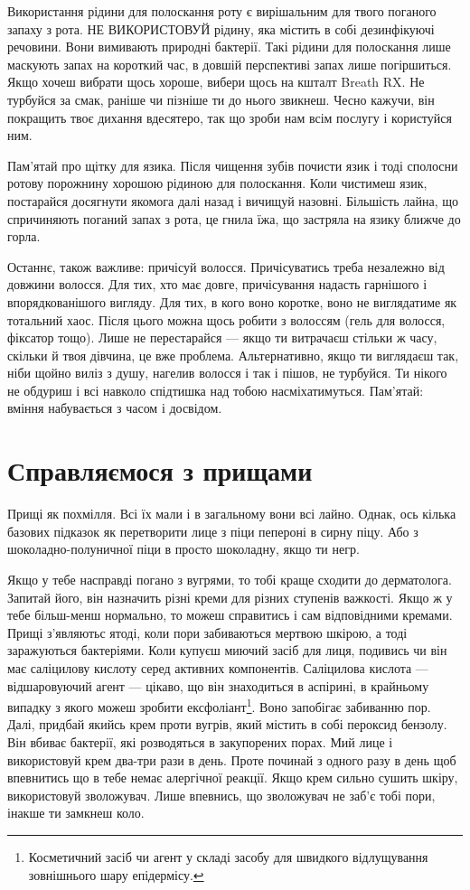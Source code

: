 Використання рідини для полоскання роту є вирішальним для твого поганого запаху
з рота. НЕ ВИКОРИСТОВУЙ рідину, яка містить в собі дезинфікуючі речовини. Вони
вимивають природні бактерії. Такі рідини для полоскання лише маскують запах
на короткий час, в довшій перспективі запах лише погіршиться. Якщо хочеш
вибрати щось хороше, вибери щось на кшталт Breath RX. Не турбуйся за смак,
раніше чи пізніше ти до нього звикнеш. Чесно кажучи, він покращить твоє дихання
вдесятеро, так що зроби нам всім послугу і користуйся ним.

Пам’ятай про щітку для язика. Після чищення зубів почисти язик і тоді сполосни
ротову порожнину хорошою рідиною для полоскання. Коли чистимеш язик, постарайся
досягнути якомога далі назад і вичищуй назовні. Більшість лайна, що спричиняють
поганий запах з рота, це гнила їжа, що застряла на язику ближче до горла.

Останнє, також важливе: причісуй волосся. Причісуватись треба незалежно від
довжини волосся. Для тих, хто має довге, причісування надасть гарнішого і
впорядкованішого вигляду. Для тих, в кого воно коротке, воно не виглядатиме як
тотальний хаос. Після цього можна щось робити з волоссям (гель для волосся,
фіксатор тощо). Лише не перестарайся — якщо ти витрачаєш стільки ж часу,
скільки й твоя дівчина, це вже проблема. Альтернативно, якщо ти виглядаєш так,
ніби щойно виліз з душу, нагелив волосся і так і пішов, не турбуйся. Ти нікого
не обдуриш і всі навколо спідтишка над тобою насміхатимуться. Пам’ятай: вміння
набувається з часом і досвідом.

\section{Справляємося з прищами}
Прищі як похмілля. Всі їх мали і в загальному вони всі лайно. Однак, ось кілька
базових підказок як перетворити лице з піци пепероні в сирну піцу. Або з
шоколадно-полуничної піци в просто шоколадну, якщо ти негр.

Якщо у тебе насправді погано з вугрями, то тобі краще сходити до дерматолога.
Запитай його, він назначить різні креми для різних ступенів важкості. Якщо ж
у тебе більш-менш нормально, то можеш справитись і сам відповідними кремами.
Прищі з’являютьс ятоді, коли пори забиваються мертвою шкірою, а тоді
заражуються бактеріями. Коли купуєш миючий засіб для лиця, подивись чи він має
саліцилову кислоту серед активних компонентів. Саліцилова кислота —
відшаровуючий агент — цікаво, що він знаходиться в аспірині, в крайньому
випадку з якого можеш зробити ексфоліант\footnote{Косметичний засіб чи агент
у складі засобу для швидкого відлущування зовнішнього шару епідермісу.}. Воно
запобігає забиванню пор. Далі, придбай якийсь крем проти вугрів, який містить
в собі пероксид бензолу. Він вбиває бактерії, які розводяться в закупорених
порах. Мий лице і використовуй крем два-три рази в день. Проте починай з одного
разу в день щоб впевнитись що в тебе немає алергічної реакції. Якщо крем сильно
сушить шкіру, використовуй зволожувач. Лише впевнись, що зволожувач не заб’є
тобі пори, інакше ти замкнеш коло.

